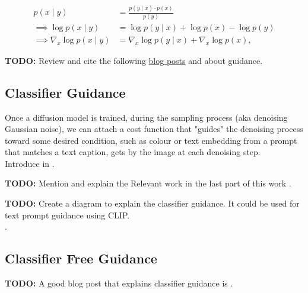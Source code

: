     \begin{equation}
         \begin{split}
            p(x \mid y) &= \frac{p(y \mid x) \cdot p(x)}{p(y)}\\
            \implies \log p(x \mid y) &= \log p(y \mid x) + \log p(x) - \log p(y) \\
            \implies \nabla_x \log p(x \mid y) &= \nabla_x \log p(y \mid x) + \nabla_x \log p(x) ,
        \end{split}
    \end{equation}
    

    \textbf{TODO:} Review and cite the following \href{https://sander.ai/2023/08/28/geometry.html}{blog posts} \cite{dieleman2022guidance} and \cite{dieleman2023geometry} about guidance.

\subsection{Classifier Guidance}

    Once a diffusion model is trained, during the sampling
    process (aka denoising Gaussian noise), we can attach
    a cost function that "guides" the denoising process toward
    some desired condition, such as colour or text embedding from a prompt that matches a text caption, gets by the image at each denoising step.\\ Introduce in \cite{nichol2021glide}.

    \textbf{TODO:} Mention and explain the Relevant work in the last part of this work \cite{Dhariwal2021DiffusionMB}.\\     


    \textbf{TODO:} Create a diagram to explain the classifier guidance. It could be used for text prompt guidance using CLIP.\\ .
    
\subsection{Classifier Free Guidance}

    \textbf{TODO:} A good blog post that explains classifier guidance is \cite{dieleman2022guidance}. \\


